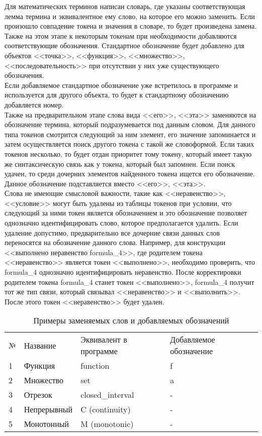 \documentclass[12pt]{article}
\begin{document}
Для математических терминов написан словарь, где указаны соответствующая лемма термина и эквивалентное ему слово, на которое его можно заменить. Если произошло совпадение токена и значения в словаре, то будет произведена замена.  Также на этом этапе к некоторым токенам при необходимости добавляются соответствующие обозначения.  Стандартное обозначение будет добавлено для объектов <<точка>>, <<функция>>, <<множество>>, <<последовательность>> при отсутствии у них уже существующего обозначения. \\

Если добавляемое стандартное обозначение уже встретилось в программе и используется для другого объекта, то будет к стандартному обозначению добавляется номер.\\

Также на предварительном этапе слова вида <<его>>, <<эта>> заменяются на обозначение термина, который подразумевается под данным словом. Для данного типа токенов смотрится следующий за ним элемент, его значение запоминается и затем осуществляется поиск другого токена с такой же словоформой. Если таких токенов несколько, то будет отдан приоритет тому токену, который имеет такую же синтаксическую связь как у токена, который был запомнен. Если поиск удачен, то среди дочерних элементов найденного токена ищется его обозначение. Данное обозначение подставляется вместо <<его>>, <<эта>>. \\

Слова не имеющие смысловой важности, такие как <<неравенство>>, <<условие>> могут быть удалены из таблицы токенов при условии, что следующий за ними токен является обозначением и это обозначение позволяет однозначно идентифицировать слово, которое предполагается удалить. Если удаление допустимо, предварительно все дочерние связи данных слов переносятся на обозначение данного слова. Например, для конструкции <<выполнено неравенство formula\_4>>, где родителем токена <<неравенство>> является токен <<выполнено>>,  необходимо проверить, что formula\_4 однозначно идентифицировать неравенство. После корректировки родителем токена formula\_4 станет токен <<выполнено>>,  formula\_4 получит тот же тип связи, который связывал <<неравенство>> и <<выполнить>>. После этого токен <<неравенство>> будет удален.\\

\begin{table}[h!]
\begin{tabular}{ l l l l}
№ & Название & Эквивалент в программе & Добавляемое обозначение \\
1 & Функция & function & f \\
2 & Множество & set & a \\
3 & Отрезок & closed\_interval & - \\
4 & Непрерывный & C (continuity) & - \\
5 & Монотонный & M (monotonic) & - \\

\end{tabular}
\label{table:satellites}
  \caption{Примеры заменяемых слов и добавляемых обозначений}
\end{table} 
\end{document}
